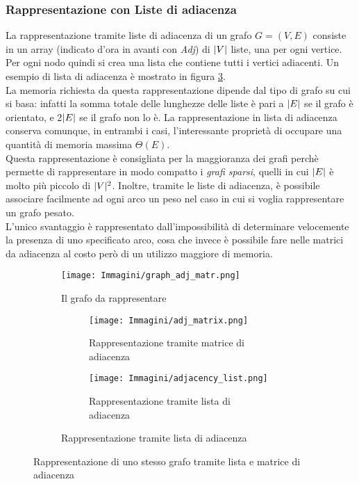 \subsubsection{Rappresentazione con Liste di adiacenza}
La rappresentazione tramite liste di adiacenza di un grafo $G = (V, E)$ consiste in  un array (indicato d'ora in avanti con \textit{Adj}) di $\arrowvert V\arrowvert$ liste, una per ogni vertice. Per ogni nodo quindi si crea una lista che contiene tutti i vertici adiacenti. Un esempio di lista di adiacenza è mostrato in figura \ref{fig:list_adj}.\\
La memoria richiesta da questa rappresentazione dipende dal tipo di grafo su cui si basa: infatti la somma totale delle lunghezze delle liste è pari a $\arrowvert E\arrowvert$ se il grafo è orientato, e 2$\arrowvert E\arrowvert$ se il grafo non lo è. La rappresentazione in lista di adiacenza conserva comunque, in entrambi i casi, l'interessante proprietà di occupare una quantità di memoria massima $\Theta(E)$.\\
Questa rappresentazione è consigliata per la maggioranza dei grafi perchè permette di rappresentare in modo compatto i \emph{grafi sparsi}, quelli in cui $\arrowvert E\arrowvert$ è molto più piccolo di $\arrowvert V\arrowvert ^2$. Inoltre, tramite le liste di adiacenza, è possibile associare facilmente ad ogni arco un peso nel caso in cui si voglia rappresentare un grafo pesato.\\
L'unico svantaggio è rappresentato dall'impossibilità di determinare velocemente la presenza di uno specificato arco, cosa che invece è possibile fare nelle matrici da adiacenza al costo però di un utilizzo maggiore di memoria.
\begin{figure}[H]
	\centering
	\begin{subfigure}{1.0\textwidth}
		\centering
		\texttt{[image: Immagini/graph\_adj\_matr.png]}
		\caption{Il grafo da rappresentare}
	\end{subfigure}
	\begin{subfigure}{1.0\textwidth}
		\centering
		\begin{subfigure}{0.5\textwidth}
			\centering
			\texttt{[image: Immagini/adj\_matrix.png]}
			\caption{Rappresentazione tramite matrice di adiacenza}
			\label{fig:matrix_adj}
		\end{subfigure}%
		\begin{subfigure}{0.5\textwidth}
			\centering
			\texttt{[image: Immagini/adjacency\_list.png]}
			\caption{Rappresentazione tramite lista di adiacenza}
			\label{fig:list_adj}
		\end{subfigure}
	\end{subfigure}
	\label{fig:adj_matrix_graph}
	\caption{Rappresentazione di uno stesso grafo tramite lista e matrice di adiacenza}
\end{figure}

